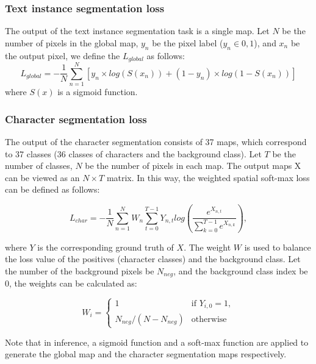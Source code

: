 \documentclass[runningheads]{llncs}
\begin{document}
\subsubsection{Text instance segmentation loss}
The output of the text instance segmentation task is a single map. Let $N$ be the number of pixels in the global map, $y_n$ be the pixel label ($y_n \in {0,1}$), and $x_n$ be the output pixel, we define the $L_{global}$ as follows:
\begin{equation}
L_{global} = -\frac{1}{N}\sum_{n=1}^{N}\left [ y_n \times log(S(x_n)) + (1-y_n) \times log(1- S(x_n)) \right ]
\end{equation}
where $S(x)$ is a sigmoid function.

\subsubsection{Character segmentation loss}
The output of the character segmentation consists of 37 maps, which correspond to 37 classes (36 classes of characters and the background class). Let $T$ be the number of classes, $N$ be the number of pixels in each map. The output maps X can be viewed as an $N \times T$ matrix. In this way, the weighted spatial soft-max loss can be defined as follows:

\begin{equation}
L_{char} = -\frac{1}{N}\sum_{n=1}^{N}W_n\sum_{t=0}^{T-1} Y_{n,t} log(\frac{e^{X_{n,t}}}{\sum_{k=0}^{T-1} e^{X_{n,k}}}),
\end{equation}

where $Y$ is the corresponding ground truth of $X$. The weight $W$ is used to balance the loss value of the positives (character classes) and the background class. Let the number of the background pixels be $N_{neg}$, and the background class index be $0$, the weights can be calculated as:

\begin{equation}
  W_i = 
  \begin{cases}
    1& \text{if } Y_{i,0}=1, \\
    N_{neg} / (N - N_{neg})& \text{otherwise}
  \end{cases}
\end{equation}


Note that in inference, a sigmoid function and a soft-max function are applied to generate the global map and the character segmentation maps respectively.
\end{document}

